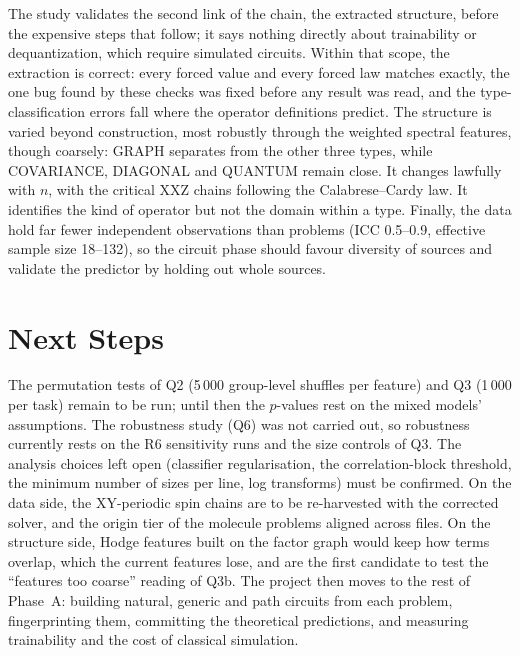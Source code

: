 \documentclass[10pt,a4paper]{article}
\begin{document}
The study validates the second link of the chain, the extracted structure,
before the expensive steps that follow; it says nothing directly about
trainability or dequantization, which require simulated circuits. Within that
scope, the extraction is correct: every forced value and every forced law
matches exactly, the one bug found by these checks was fixed before any result
was read, and the type-classification errors fall where the operator
definitions predict. The structure is varied beyond construction, most
robustly through the weighted spectral features, though coarsely: GRAPH
separates from the other three types, while COVARIANCE, DIAGONAL and QUANTUM
remain close. It changes lawfully with $n$, with the critical XXZ chains
following the Calabrese--Cardy law. It identifies the kind of operator but
not the domain within a type. Finally, the data hold far fewer independent
observations than problems (ICC 0.5--0.9, effective sample size 18--132), so
the circuit phase should favour diversity of sources and validate the
predictor by holding out whole sources.

\section{Next Steps}

The permutation tests of Q2 (5\,000 group-level shuffles per feature) and Q3
(1\,000 per task) remain to be run; until then the $p$-values rest on the
mixed models' assumptions. The robustness study (Q6) was not carried out, so
robustness currently rests on the R6 sensitivity runs and the size controls of
Q3. The analysis choices left open (classifier regularisation, the
correlation-block threshold, the minimum number of sizes per line, log
transforms) must be confirmed. On the data side, the XY-periodic spin chains
are to be re-harvested with the corrected solver, and the origin tier of the
molecule problems aligned across files. On the structure side, Hodge features
built on the factor graph would keep how terms overlap, which the current
features lose, and are the first candidate to test the ``features too
coarse'' reading of Q3b. The project then moves to the rest of Phase~A:
building natural, generic and path circuits from each problem, fingerprinting
them, committing the theoretical predictions, and measuring trainability and
the cost of classical simulation.
\end{document}
